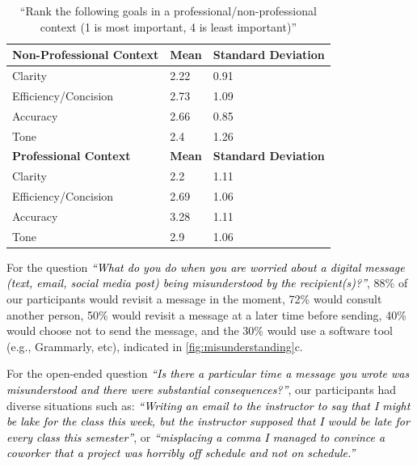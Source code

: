\documentclass[acmsmall,screen,authorversion,nonacm]{acmart}
\newcommand{\QUOTE}[1]{\textsf{\textit{\textcolor{black}{``#1''}}}}
\begin{document}
\begin{table}[]
\begin{tabular}{|l|l|l|}
 \hline           
\textbf{Non-Professional Context} & \textbf{Mean} & \textbf{Standard Deviation} \\ \hline
Clarity                 & 2.22  & 0.91               \\\hline
Efficiency/Concision    & 2.73  & 1.09               \\\hline
Accuracy                & 2.66  & 0.85               \\\hline
Tone                    & 2.4   & 1.26               \\\hline 
\textbf{Professional Context} & \textbf{Mean} & \textbf{Standard Deviation} \\ \hline
Clarity                 & 2.2  & 1.11               \\\hline
Efficiency/Concision    & 2.69  & 1.06               \\\hline
Accuracy                & 3.28  & 1.11               \\\hline
Tone                    & 2.9   & 1.06             \\\hline            
\end{tabular}
\caption{\label{tab:goals_of_comm} ``Rank the following goals in a professional/non-professional context (1 is most important, 4 is least important)''}
\vspace{-1.5pc}
\end{table}


For the question \QUOTE{What do you do when you are worried about a digital message (text, email, social media post) being misunderstood by the recipient(s)?}, 88\% of our participants would revisit a message in the moment, 72\% would consult another person, 50\% would revisit a message at a later time before sending, 40\% would choose not to send the message, and the 30\% would use a software tool (e.g., Grammarly, etc), indicated in \autoref{fig:misunderstanding}c. 

For the open-ended question \QUOTE{Is there a particular time a message you wrote was misunderstood and there were substantial consequences?}, our participants had diverse situations such as: \QUOTE{Writing an email to the instructor to say that I might be lake for the class this week, but the instructor supposed that I would be late for every class this semester}, or \QUOTE{misplacing a comma I managed to convince a coworker that a project was horribly off schedule and not on schedule.}
\end{document}

